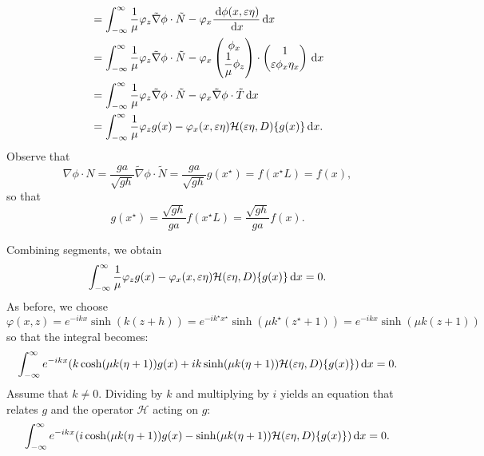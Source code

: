 \documentclass[10pt,reqno,oneside,a4paper]{article}
\begin{document}
\begin{itemize}
\begin{align*}
&= \int_{-\infty}^{\infty} \frac{1}{\mu} \varphi_z \tilde{\nabla} \phi \cdot \tilde{N} -\varphi_x \frac{\,\mathrm{d} \phi(x, \varepsilon \eta)}{\,\mathrm{d} x} \,\mathrm{d} x \\
&= \int_{-\infty}^{\infty} \frac{1}{\mu} \varphi_z \tilde{\nabla} \phi \cdot \tilde{N} -\varphi_x \begin{pmatrix} \phi_x  \\ \dfrac{1}{\mu}\phi_z \end{pmatrix} \cdot \begin{pmatrix} 1 \\ \varepsilon \phi_x \eta_x \end{pmatrix} \,\mathrm{d} x \\
&= \int_{-\infty}^{\infty} \frac{1}{\mu} \varphi_z \tilde{\nabla} \phi \cdot \tilde{N} -\varphi_x \tilde{\nabla} \phi \cdot \tilde{T} \,\mathrm{d} x \\
&= \int_{-\infty}^{\infty} \frac{1}{\mu} \varphi_z g(x) -\varphi_x(x, \varepsilon \eta) \mathcal{H}(\varepsilon \eta, D)\{ g(x) \} \,\mathrm{d} x.
\end{align*}
Observe that 
\[ \nabla \phi \cdot N = \frac{ga}{\sqrt{gh}} \tilde{\nabla} \phi \cdot \tilde{N} = \frac{ga}{\sqrt{gh}} g(x^{\star}) = f(x^{\star} L) = f(x), \]
so that 
\[ 
g(x^{\star}) = \frac{\sqrt{gh}}{ga}f(x^{\star}L) = \frac{\sqrt{gh}}{ga}f(x).
\]
\end{itemize}
Combining segments, we obtain 
\begin{align*}
\int_{-\infty}^{\infty} \frac{1}{\mu}\varphi_z g(x) -\varphi_x(x, \varepsilon\eta) \mathcal{H}( \varepsilon\eta, D)\{ g(x) \} \,\mathrm{d} x = 0.
\end{align*}
As before, we choose $\varphi(x,z) = e^{-ikx} \sinh(k(z+h)) = e^{-ik^{\star}x^{\star}} \sinh(\mu k^{\star}(z^{\star}+1)) = e^{-ikx} \sinh(\mu k(z+1))$ so that the integral becomes:
\begin{align*}
\int_{-\infty}^{\infty} e^{-ikx}( k \cosh(\mu k(\eta+1)) g(x) + ik \sinh(\mu k(\eta+1)) \mathcal{H}( \varepsilon \eta, D)\{ g(x) \}) \,\mathrm{d} x = 0.
\end{align*}
Assume that $k \neq 0.$ Dividing by $k$ and multiplying by $i$ yields an equation that relates $g$ and the operator $\mathcal{H}$ acting on $g:$
\begin{equation}\label{NDimHbehav}
\int_{-\infty}^{\infty} e^{-ikx}( i  \cosh(\mu k(\eta+1)) g(x) - \sinh(\mu k(\eta+1)) \mathcal{H}( \varepsilon \eta, D)\{ g(x) \}) \,\mathrm{d} x = 0.
\end{equation}
\end{document}
